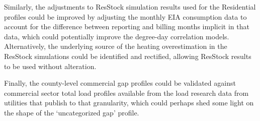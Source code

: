 Similarly, the adjustments to ResStock simulation results used for the Residential profiles could be improved by adjusting the monthly EIA consumption data to account for the difference between reporting and billing months implicit in that data, which could potentially improve the degree-day correlation models. Alternatively, the underlying source of the heating overestimation in the ResStock simulations could be identified and rectified, allowing ResStock results to be used without alteration.

Finally, the county-level commercial gap profiles could be validated against commercial sector total load profiles available from the load research data from utilities that publish to that granularity, which could perhaps shed some light on the shape of the ‘uncategorized gap’ profile.
